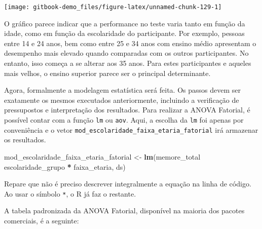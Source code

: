 \documentclass[
]{book}
\newenvironment{Shaded}{\begin{snugshade}}{\end{snugshade}}
\newcommand{\KeywordTok}[1]{\textcolor[rgb]{0.13,0.29,0.53}{\textbf{#1}}}
\newcommand{\NormalTok}[1]{#1}
\newcommand{\OperatorTok}[1]{\textcolor[rgb]{0.81,0.36,0.00}{\textbf{#1}}}
\newcommand{\StringTok}[1]{\textcolor[rgb]{0.31,0.60,0.02}{#1}}
\begin{document}
\begin{center}\texttt{[image: gitbook-demo\_files/figure-latex/unnamed-chunk-129-1]} \end{center}

O gráfico parece indicar que a performance no teste varia tanto em
função da idade, como em função da escolaridade do participante. Por
exemplo, pessoas entre 14 e 24 anos, bem como entre 25 e 34 anos com
ensino médio apresentam o desempenho mais elevado quando comparadas com
os outros participantes. No entanto, isso começa a se alterar aos 35
anos. Para estes participantes e aqueles mais velhos, o ensino superior
parece ser o principal determinante.

Agora, formalmente a modelagem estatística será feita. Os passos devem
ser exatamente os mesmos executados anteriormente, incluindo a
verificação de pressupostos e interpretação dos resultados. Para
realizar a ANOVA Fatorial, é possível contar com a função \texttt{lm} ou
\texttt{aov}. Aqui, a escolha da \texttt{lm} foi apenas por conveniência
e o vetor \texttt{mod\_escolaridade\_faixa\_etaria\_fatorial} irá
armazenar os resultados.

\begin{Shaded}
\begin{Highlighting}[]
\NormalTok{mod_escolaridade_faixa_etaria_fatorial <-}\StringTok{ }\KeywordTok{lm}\NormalTok{(memore_total }\OperatorTok{~}\StringTok{ }\NormalTok{escolaridade_grupo }\OperatorTok{*}\StringTok{ }\NormalTok{faixa_etaria, ds)}
\end{Highlighting}
\end{Shaded}

Repare que não é preciso descrever integralmente a equação na linha de
código. Ao usar o símbolo \texttt{*}, o R já faz o restante.

A tabela padronizada da ANOVA Fatorial, disponível na maioria dos
pacotes comerciais, é a seguinte:
\end{document}
